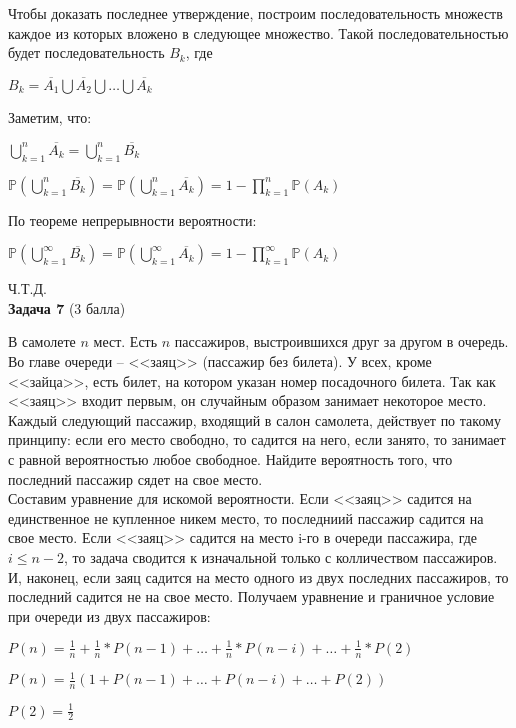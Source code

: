 \documentclass{article}
\newcommand\myp{\mathbb P}
\begin{document}
Чтобы доказать последнее утверждение, построим последовательность множеств каждое из которых вложено в следующее множество. Такой последовательностью будет последовательность $B_k$, где 
\begin{center}
	$B_k = \overline{A_1}\bigcup\overline{A_2}\bigcup\dots\bigcup\overline{A_k}$ 
\end{center}

Заметим, что:
\begin{center}
	$\bigcup\limits_{k=1}^{n} \overline{A_k} = \bigcup\limits_{k=1}^{n} \overline{B_k}$
	
	$\myp(\bigcup\limits_{k=1}^{n} \overline{B_k}) = \myp(\bigcup\limits_{k=1}^{n} \overline{A_k}) = 1 - \prod\limits_{k=1}^{n}\myp(A_k)$
\end{center}

По теореме непрерывности вероятности:
\begin{center}
	$\myp(\bigcup\limits_{k=1}^{\infty} \overline{B_k}) = \myp(\bigcup\limits_{k=1}^{\infty} \overline{A_k}) = 1 - \prod\limits_{k=1}^{\infty}\myp(A_k)$
\end{center}

Ч.Т.Д.\\

\textbf{Задача 7} (3 балла)

В самолете $n$ мест.
Есть $n$ пассажиров, выстроившихся друг за другом в очередь.
Во главе очереди -- <<заяц>> (пассажир без билета).
У всех, кроме <<зайца>>, есть билет, на котором указан номер посадочного билета.
Так как <<заяц>> входит первым, он случайным образом занимает некоторое 
место.
Каждый следующий пассажир, входящий в салон самолета, действует по такому 
принципу: если его место свободно, то садится на него, если занято, то занимает с 
равной вероятностью любое свободное.
Найдите вероятность того, что последний пассажир сядет на свое место.\\

Составим уравнение для искомой вероятности. Если <<заяц>> садится на единственное не купленное никем место, то последниий пассажир садится на свое место. Если <<заяц>> садится на место i-го в очереди пассажира, где $i \leq n-2$, то задача сводится к изначальной только с колличеством пассажиров. И, наконец, если заяц садится на место одного из двух последних пассажиров, то последний садится не на свое место. Получаем уравнение и граничное условие при очереди из двух пассажиров:

\begin{center}
    $P(n) = \frac{1}{n} + \frac{1}{n}*P(n-1) + \dots + \frac{1}{n}*P(n-i) + \dots + \frac{1}{n}*P(2)$
    
    $P(n) = \frac{1}{n}(1 + P(n-1) + \dots + P(n-i) + \dots + P(2))$
    
    $P(2) = \frac{1}{2}$
\end{center}
\end{document}
